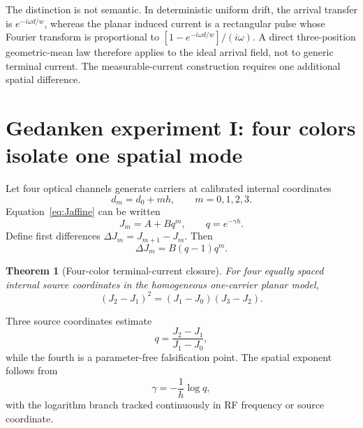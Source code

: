 \documentclass[11pt]{article}
\newtheorem{theorem}{Theorem}
\begin{document}
The distinction is not semantic. In deterministic uniform drift, the arrival transfer is $e^{-i\omega d/w}$, whereas the planar induced current is a rectangular pulse whose Fourier transform is proportional to $[1-e^{-i\omega d/w}]/(i\omega)$. A direct three-position geometric-mean law therefore applies to the ideal arrival field, not to generic terminal current. The measurable-current construction requires one additional spatial difference.

\section{Gedanken experiment I: four colors isolate one spatial mode}

Let four optical channels generate carriers at calibrated internal coordinates
\begin{equation}
d_m=d_0+mh,
\qquad m=0,1,2,3.
\label{eq:fourcoords}
\end{equation}
Equation~\eqref{eq:Jaffine} can be written
\begin{equation}
J_m=A+Bq^m,
\qquad q=e^{-\gamma h}.
\label{eq:affineseq}
\end{equation}
Define first differences $\Delta J_m=J_{m+1}-J_m$. Then
\begin{equation}
\Delta J_m=B(q-1)q^m.
\label{eq:firstdiff}
\end{equation}

\begin{theorem}[Four-color terminal-current closure]
For four equally spaced internal source coordinates in the homogeneous one-carrier planar model,
\begin{equation}
\boxed{(J_2-J_1)^2=(J_1-J_0)(J_3-J_2).}
\label{eq:fourclosure}
\end{equation}
\end{theorem}

Three source coordinates estimate
\begin{equation}
\boxed{q=\frac{J_2-J_1}{J_1-J_0},}
\label{eq:qrecover}
\end{equation}
while the fourth is a parameter-free falsification point. The spatial exponent follows from
\begin{equation}
\boxed{\gamma=-\frac{1}{h}\log q,}
\label{eq:grecover}
\end{equation}
with the logarithm branch tracked continuously in RF frequency or source coordinate.
\end{document}

